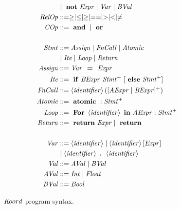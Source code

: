 \begin{figure}[H]
\begin{mdframed}
\begin{align*}
\begin{split}
&\mid \mterm{not} \expr \mid \var\mid \bval\\
\mathit{RelOp} &::=  \geq \mid \leq \mid \geq \mid == \mid > \mid < \mid \neq\\ 
\mathit{COp} &::=  \mterm{and} \mid \mterm{or} \\\\ 
\stmt &::= \asgn \mid \fncall\mid\atmc  \\ 
      & \mid\cndnl\mid \floop \mid \ret \\
\asgn &::= \var\ \mterm{=}\  \expr \\
\cndnl &::= \mterm{if} \bexpr\ \stmts \ [\mterm{else} \stmts]\\
\fncall &::= \id ([\aexpr\mid\bexpr]^+) \\
\atmc &::= \mterm{atomic}: \stmts\\
\floop &::= \mterm{For} \id \mterm{in} \aexpr : \stmts\\
\ret &::= \mterm{return} \expr \mid \mterm{return} \\\\
\var &::= \id \mid \id [\expr] \\ &\mid \id \mterm{.} \id \\
\val &::= \aval \mid \bval \\
\aval &::= \mathit{Int} \mid \mathit{Float}  \\
\bval &::= \mathit{Bool} 
\end{split}
\end{align*}\end{mdframed}
\caption{$\lgname$ program syntax.}
\label{fig:syntax}
\end{figure}



